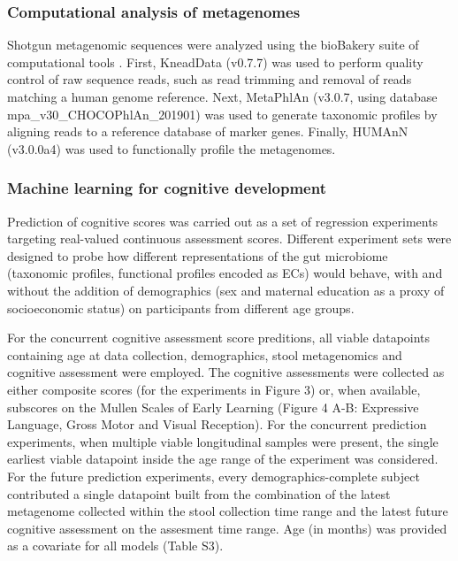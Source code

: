 \documentclass{article}
\begin{document}
\subsubsection*{Computational analysis of metagenomes}

Shotgun metagenomic sequences were analyzed using the bioBakery suite of
computational tools \cite{beghiniIntegratingTaxonomicFunctional2021}.
First, KneadData (v0.7.7) was used to perform quality
control of raw sequence reads, such as read trimming and removal of
reads matching a human genome reference. Next, MetaPhlAn (v3.0.7, using
database mpa\_v30\_CHOCOPhlAn\_201901) was used to generate taxonomic
profiles by aligning reads to a reference database of marker genes.
Finally, HUMAnN (v3.0.0a4) was used to functionally profile the
metagenomes.

\subsubsection*{Machine learning for cognitive development}

Prediction of cognitive scores was carried out as a set of regression
experiments targeting real-valued continuous assessment scores.
Different experiment sets were designed to probe how different
representations of the gut microbiome (taxonomic profiles, functional
profiles encoded as ECs) would behave, with and without the addition of
demographics (sex and maternal education as a proxy of socioeconomic
status) on participants from different age groups.

For the concurrent cognitive assessment score preditions,
all viable datapoints containing 
age at data collection, demographics, stool metagenomics and cognitive assessment were employed.
The cognitive assessments were collected as either composite scores
(for the experiments in Figure 3) or, when available, subscores on the
Mullen Scales of Early Learning (Figure 4 A-B: Expressive Language, Gross Motor and Visual Reception).
For the concurrent prediction experiments, when multiple viable longitudinal samples were present,
the single earliest viable datapoint inside the age range of the experiment was considered.
For the future prediction experiments, every demographics-complete subject
contributed a single datapoint built from the combination of
the latest metagenome collected within the stool collection time range and
the latest future cognitive assessment on the assesment time range.
Age (in months) was provided as a covariate for all models (Table S3).
\end{document}
